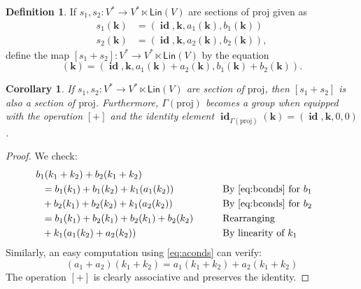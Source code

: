 \documentclass[12pt]{article}
\newcounter{counter}
\theoremstyle{definition}
\newtheorem{dfn}[counter]{Definition}
\theoremstyle{plain}
\newtheorem{cor}[counter]{Corollary}
\newcommand{\id}{\mathop{\mathbf{id}}\nolimits}
\begin{document}
\begin{dfn} \label{sumofsectionsdfn}
    If \(s_1, s_2 \colon V^{*} \to V^* \ltimes \mathsf{Lin} (V)\) are sections of \(\mathrm{proj}\) given as
    \begin{align}
        s_1 (\mathbf{k}) &= (\id, \mathbf{k}, a_1 (\mathbf{k}), b_1 (\mathbf{k})) \\
        s_2 (\mathbf{k}) &= (\id, \mathbf{k}, a_2 (\mathbf{k}), b_2 (\mathbf{k})),
    \end{align}
    define the map \([s_1 + s_2] \colon V^{*} \to V^* \ltimes \mathsf{Lin} (V)\) by the equation
    \begin{equation}
        [s_1 + s_2] (\mathbf{k}) = (\id, \mathbf{k}, a_1 (\mathbf{k}) + a_2 (\mathbf{k}), b_1 (\mathbf{k}) + b_2 (\mathbf{k})).
    \end{equation}
\end{dfn}

\begin{cor}
    If \(s_1, s_2 \colon V^{*} \to V^* \ltimes \mathsf{Lin} (V)\) are section of \(\mathrm{proj}\), then \([s_1 + s_2]\) is also a section of \(\mathrm{proj}\). Furthermore,
    \(\Gamma(\mathrm{proj})\) becomes a group when equipped with the operation \([+]\) and the identity element \(\id_{\Gamma(\mathrm{proj})} (\mathbf{k}) = (\id, \mathbf{k}, 0, 0)\).\\
\end{cor}

\begin{proof}
    We check:
    \begin{alignat}{3}
        &\hskip -6pt  b_1(k_1+k_2)+b_2(k_1+k_2)\\
        &= b_1(k_1)+b_1(k_2)+k_1(a_1(k_2)) &&\text{By \autoref{eq:bconds} for }b_1\\
        &+b_2(k_1)+b_2(k_2)+k_1(a_2(k_2)) &&\text{By \autoref{eq:bconds} for }b_2\\
        &=b_1(k_1)+b_2(k_1)+b_2(k_1)+b_2(k_2) \qquad &&\text{Rearranging}\\
        &+ k_1(a_1(k_2)+a_2(k_2)) &&\text{By linearity of }k_1
    \end{alignat}
    Similarly, an easy computation using \autoref{eq:aconds} can verify:
    \begin{equation}
        (a_1+a_2)(k_1+k_2)=a_1(k_1+k_2)+a_2(k_1+k_2)
    \end{equation}
    The operation $[+]$ is clearly associative and preserves the identity.
\end{proof}
\end{document}
